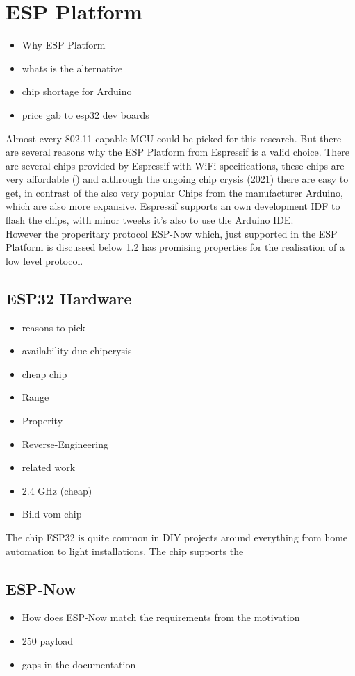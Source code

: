 \documentclass[]{ccs-thesis}
\begin{document}
\section{ESP Platform}
\begin{itemize}
	\item Why ESP Platform 
	\item whats is the alternative
	\item chip shortage for Arduino
	\item price gab to esp32 dev boards
\end{itemize}
Almost every 802.11 capable \ac{MCU} could be picked for this research.
But there are several reasons why the ESP Platform from Espressif is a valid choice.
There are several chips provided by Espressif with WiFi specifications, these chips are very affordable () 
and althrough the ongoing chip crysis (2021) there are easy to get, in contrast of the also very popular Chips from the manufacturer Arduino, which are also more expansive.
Espressif supports an own development IDF to flash the chips, with minor tweeks it's also to use the Arduino IDE.\\
However the properitary protocol ESP-Now which, just supported in the ESP Platform is discussed below \cref{sub:ESP-Now} has promising properties for the realisation of a low level protocol.

\subsection{ESP32 Hardware}
\begin{itemize}
\item reasons to pick
\item availability due chipcrysis
\item cheap chip
\item Range
\item Properity
\item Reverse-Engineering 
\item related work
\item 2.4 GHz (cheap)
\item Bild vom chip
\end{itemize}
The chip ESP32 is quite common in DIY projects around everything from home automation to light installations. The chip supports the 

\subsection{ESP-Now}
\label{sub:ESP-Now}
\begin{itemize}
\item How does ESP-Now match the requirements from the motivation
\item 250 payload
\item gaps in the documentation
\end{itemize}
\end{document}
